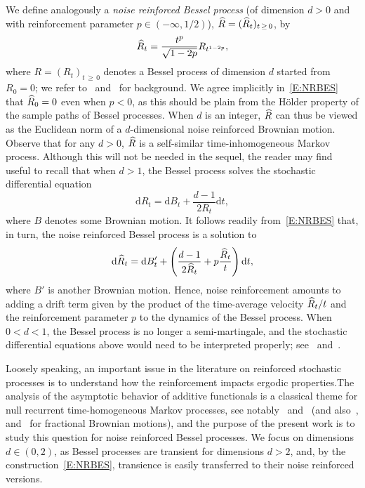\documentclass[AHL,Unicode,longabstracts,published]{cedram}
\renewcommand{\hat}[1]{\widehat{#1}}
\newcommand{\dd}{\mathrm{d}}
\let\oldhat\hat
\renewcommand*{\hat}[1]{\mathchoice{\widehat{#1}}{\widehat{#1}}{\oldhat{#1}}{\oldhat{#1}}}
\begin{document}
We define analogously a \emph{noise reinforced Bessel process} (of dimension $d>0$ and with reinforcement parameter $p\in(-\infty,1/2)$), $\hat R=(\hat R_t)_{t\,\geq\,0}$, by
\begin{equation}\label{E:NRBES}
\hat R_t = \frac{t^{p}}{\sqrt{1-2p}}{R_{t^{1-2p}}},
\end{equation}
where $R=(R_t)_{t\,\geq\,0}$ denotes a Bessel process of dimension $d$ started from $R_0=0$; we refer to~\cite[Section~XI.1]{RY} and~\cite{Lawler} for background. We agree implicitly in~\eqref{E:NRBES} that $\hat R_0=0$ even when $p<0$, as this should be plain from the H\"older property of the sample paths of Bessel processes. When $d$ is an integer, $\hat R$ can thus be viewed as the Euclidean norm of a $d$-dimensional noise reinforced Brownian motion. Observe that for any $d>0$, $\hat R$ is a self-similar time-inhomogeneous Markov process. Although this will not be needed in the sequel, the reader may find useful to recall that when $d>1$, the Bessel process solves the stochastic differential equation
\[
\dd R_t= \dd B_t + \frac{d-1}{2R_t} \dd t,
\]
where $B$ denotes some Brownian motion. It follows readily from~\eqref{E:NRBES} that, in turn, the noise reinforced Bessel process is a solution to
\[
\dd \hat R_t=\dd B'_t + \left(\frac{d-1}{2 \hat R_t} + p \frac{ \hat R_t}{t} \right) \dd t,
\]
where $B'$ is another Brownian motion. Hence, noise reinforcement amounts to adding a drift term given by the product of the time-average velocity $\hat R_t/t$ and the reinforcement parameter $p$ to the dynamics of the Bessel process. When $0< d < 1$, the Bessel process is no longer a semi-martingale, and the stochastic differential equations above would need to be interpreted properly; see~\cite{BerBes} and~\cite[Chapter~10]{MansuyYor}.



Loosely speaking, an important issue in the literature on reinforced stochastic processes is to understand how the reinforcement impacts ergodic properties.\linebreak The analysis of the asymptotic behavior of additive functionals is a classical theme for null recurrent time-homogeneous Markov processes, see notably~\cite{DK,KK,KR,PSV} and~\cite[Section~XIII.2]{RY} (and also~\cite{KaMa}, \cite{Kono} and~\cite{HNX} for fractional Brownian motions), and the purpose of the present work is to study this question for noise reinforced Bessel processes. We focus on dimensions $d\in(0,2)$, as Bessel processes are transient for dimensions $d>2$, and, by the construction~\eqref{E:NRBES}, transience is easily transferred to their noise reinforced versions.
\end{document}
